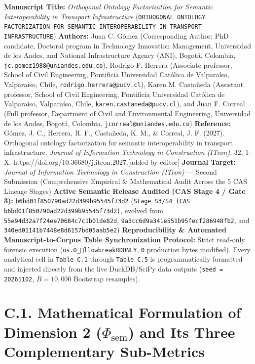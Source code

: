 \documentclass[10pt,a4paper]{article}
\begin{document}
\textbf{Manuscript Title:} \textit{Orthogonal Ontology Factorization for Semantic Interoperability in Transport Infrastructure} (\texttt{ORTHOGONAL ONTOLOGY FACTORIZATION FOR SEMANTIC INTEROPERABILITY IN TRANSPORT INFRASTRUCTURE})
\textbf{Authors:} Juan C. Gómez (Corresponding Author; PhD candidate, Doctoral program in Technology Innovation Management, Universidad de los Andes, and National Infrastructure Agency (ANI), Bogotá, Colombia, \texttt{jc.gomez1988@uniandes.edu.co}), Rodrigo F. Herrera (Associate professor, School of Civil Engineering, Pontificia Universidad Católica de Valparaíso, Valparaíso, Chile, \texttt{rodrigo.herrera@pucv.cl}), Karen M. Castañeda (Assistant professor, School of Civil Engineering, Pontificia Universidad Católica de Valparaíso, Valparaíso, Chile, \texttt{karen.castaneda@pucv.cl}), and Juan F. Correal (Full professor, Department of Civil and Environmental Engineering, Universidad de los Andes, Bogotá, Colombia, \texttt{jcorreal@uniandes.edu.co})
\textbf{Reference:} Gómez, J. C., Herrera, R. F., Castañeda, K. M., \& Correal, J. F. (2027). Orthogonal ontology factorization for semantic interoperability in transport infrastructure. \textit{Journal of Information Technology in Construction (ITcon)}, 32, 1-X. https://doi.org/10.36680/j.itcon.2027.[added by editor]
\textbf{Journal Target:} \textit{Journal of Information Technology in Construction (ITcon)} --- Second Submission (Comprehensive Empirical \& Mathematical Audit Across the 5 CAS Lineage Stages)
\textbf{Active Semantic Release Audited (CAS Stage 4 / Gate 3):} \texttt{b6bd01f850790ad22d399b95545f73d2} (\texttt{Stage S3/S4 (CAS b6bd01f850790ad22d399b95545f73d2)}, evolved from \texttt{55e94d32a7f24ee70684c7c1b01de82d}, \texttt{9a3cc6d9a341e551b95fecf286948fb2}, and \texttt{340ed01141b7448e8d6157bd05aab5e2})
\textbf{Reproducibility \& Automated Manuscript-to-Corpus Table Synchronization Protocol:} Strict read-only forensic execution (\texttt{os.O\_llowbreak{}RDONLY}, \texttt{0} production bytes modified). Every analytical cell in \texttt{Table C.1} through \texttt{Table C.5} is programmatically formatted and injected directly from the live DuckDB/SciPy data outputs (\texttt{seed = 20261102}, $B = 10,000$ Bootstrap resamples).



\section*{C.1. Mathematical Formulation of Dimension 2 ($\Phi_{\text{sem}}$) and Its Three Complementary Sub-Metrics}
\end{document}
